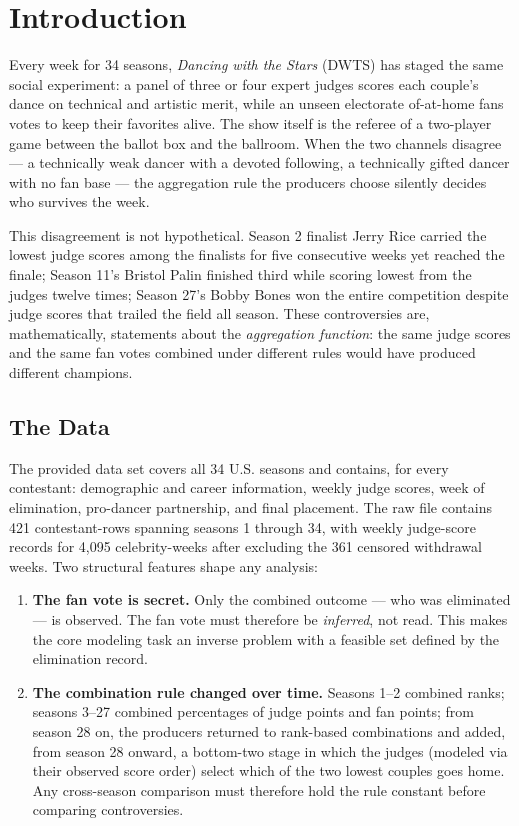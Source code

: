\documentclass[11pt]{article}
\begin{document}
\section{Introduction}
\label{sec:intro}

Every week for 34 seasons, \textit{Dancing with the Stars} (DWTS) has staged the same social
experiment: a panel of three or four expert judges scores each couple's dance on technical and
artistic merit, while an unseen electorate of-at-home fans votes to keep their favorites alive.
The show itself is the referee of a two-player game between the ballot box and the ballroom. When
the two channels disagree --- a technically weak dancer with a devoted following, a technically
gifted dancer with no fan base --- the aggregation rule the producers choose silently decides who
survives the week.

This disagreement is not hypothetical. Season 2 finalist Jerry Rice carried the lowest judge
scores among the finalists for five consecutive weeks yet reached the finale; Season 11's Bristol
Palin finished third while scoring lowest from the judges twelve times; Season 27's Bobby Bones
won the entire competition despite judge scores that trailed the field all season. These
controversies are, mathematically, statements about the \emph{aggregation function}: the same
judge scores and the same fan votes combined under different rules would have produced different
champions.

\subsection{The Data}

The provided data set covers all 34 U.S. seasons and contains, for every contestant:
demographic and career information, weekly judge scores, week of elimination, pro-dancer
partnership, and final placement. The raw file contains 421 contestant-rows spanning seasons 1
through 34, with weekly judge-score records for 4,095 celebrity-weeks after excluding the 361
censored withdrawal weeks. Two structural features shape any analysis:

\begin{enumerate}
\item \textbf{The fan vote is secret.} Only the combined outcome --- who was eliminated --- is
observed. The fan vote must therefore be \emph{inferred}, not read. This makes the core modeling
task an inverse problem with a feasible set defined by the elimination record.
\item \textbf{The combination rule changed over time.} Seasons 1--2 combined ranks; seasons
3--27 combined percentages of judge points and fan points; from season 28 on, the producers
returned to rank-based combinations and added, from season 28 onward, a bottom-two stage in which
the judges (modeled via their observed score order) select which of the two lowest couples goes
home. Any cross-season comparison must therefore hold the rule constant before comparing
controversies.
\end{enumerate}
\end{document}
